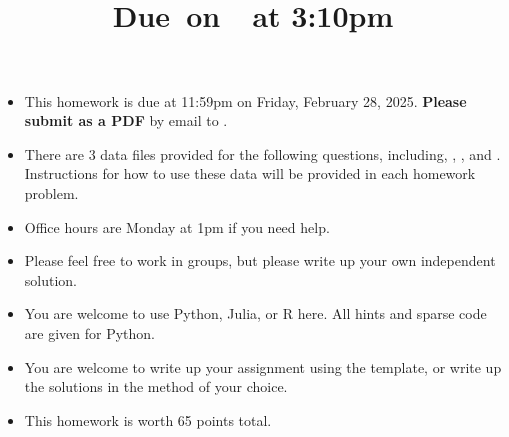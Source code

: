 \documentclass{article}
\title{
    \vspace{2in}
    \textmd{\textbf{\hmwkClass\hmwkTitle}}\\
    \normalsize\vspace{0.1in}\small{Due\ on\ \hmwkDueDate\ at 3:10pm}\\
    \vspace{3in}
}
\author{\hmwkAuthorName}
\date{}
\begin{document}

\begin{itemize}
\item This homework is due at 11:59pm on Friday, February 28, 2025. {\bf Please submit as a PDF} by email to . 
\item There are 3 data files provided for the following questions, including, , , and . Instructions for how to use these data will be provided in each homework problem. 
\item Office hours are Monday at 1pm if you need help. 
\item Please feel free to work in groups, but please write up your own independent solution. 
\item You are welcome to use Python, Julia, or R here. All hints and sparse code are given for Python.
\item You are welcome to write up your assignment using the  template, or write up the solutions in the method of your choice. 
\item This homework is worth 65 points total. 
\end{itemize}
\end{document}

